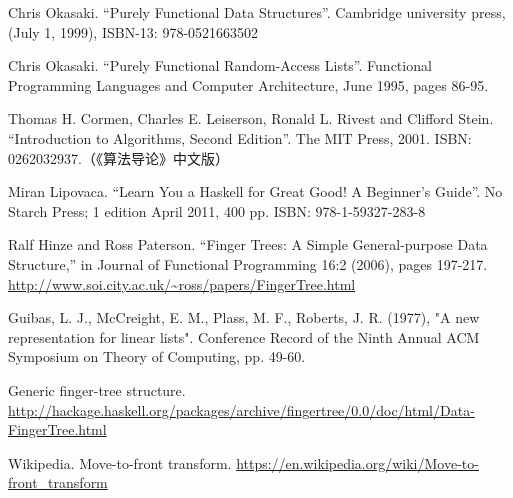 \documentclass[b5paper]{ctexart}
\begin{document}
\begin{thebibliography}{99}

Chris Okasaki. ``Purely Functional Data Structures''. Cambridge university press, (July 1, 1999), ISBN-13: 978-0521663502

Chris Okasaki. ``Purely Functional Random-Access Lists''. Functional Programming Languages and Computer Architecture, June 1995, pages 86-95.

Thomas H. Cormen, Charles E. Leiserson, Ronald L. Rivest and Clifford Stein. ``Introduction to Algorithms, Second Edition''. The MIT Press, 2001. ISBN: 0262032937.（《算法导论》中文版）

Miran Lipovaca. ``Learn You a Haskell for Great Good! A Beginner's Guide''. No Starch Press; 1 edition April 2011, 400 pp. ISBN: 978-1-59327-283-8

Ralf Hinze and Ross Paterson. ``Finger Trees: A Simple General-purpose Data Structure,'' in Journal of Functional Programming 16:2 (2006), pages 197-217. \url{http://www.soi.city.ac.uk/~ross/papers/FingerTree.html}

Guibas, L. J., McCreight, E. M., Plass, M. F., Roberts, J. R. (1977), "A new representation for linear lists". Conference Record of the Ninth Annual ACM Symposium on Theory of Computing, pp. 49-60.

Generic finger-tree structure. \url{http://hackage.haskell.org/packages/archive/fingertree/0.0/doc/html/Data-FingerTree.html}

Wikipedia. Move-to-front transform. \url{https://en.wikipedia.org/wiki/Move-to-front_transform}

\end{thebibliography}

\expandafter\enddocument
\fi
\end{document}
